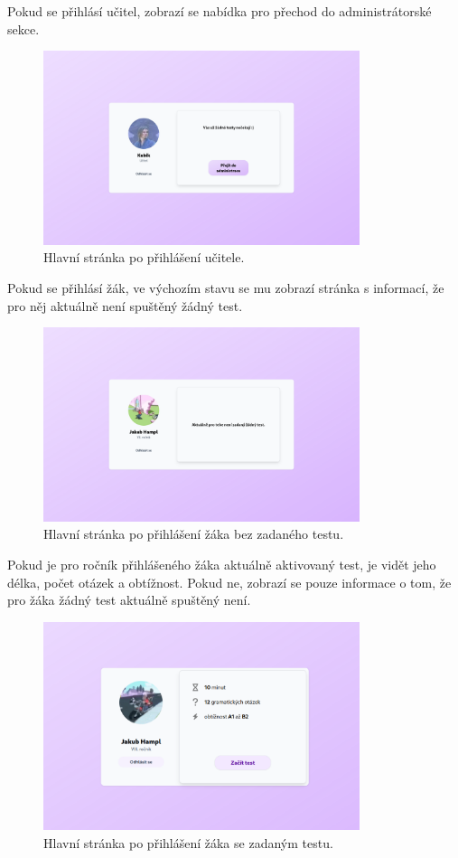\newpage

Pokud se přihlásí učitel, zobrazí se nabídka pro přechod do administrátorské sekce.

\begin{figure}[H]
    \centering
    \includegraphics[width=350px]{images/01design/teacher.png}
    \caption{Hlavní stránka po přihlášení učitele.}
\end{figure}

Pokud se přihlásí žák, ve výchozím stavu se mu zobrazí stránka s informací, že pro něj aktuálně není spuštěný žádný test.

\begin{figure}[H]
    \centering
    \includegraphics[width=350px]{images/01design/student-no-test.png}
    \caption{Hlavní stránka po přihlášení žáka bez zadaného testu.}
\end{figure}

Pokud je pro ročník přihlášeného žáka aktuálně aktivovaný test, je vidět jeho délka, počet otázek a obtížnost. Pokud ne, zobrazí se pouze informace o tom, že pro žáka žádný test aktuálně spuštěný není.

\begin{figure}[H]
    \centering
    \includegraphics[width=350px]{images/01design/student-yes-test.png}
    \caption{Hlavní stránka po přihlášení žáka se zadaným testu.}
\end{figure}

